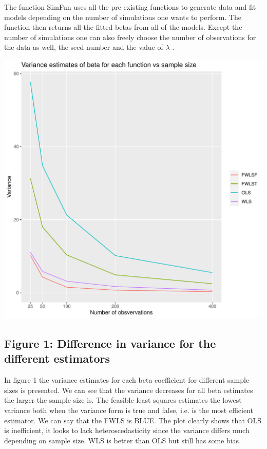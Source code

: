 \documentclass{article}\usepackage[]{graphicx}\usepackage[]{color}
\makeatletter
\def\maxwidth{ %
  \ifdim\Gin@nat@width>\linewidth
    \linewidth
  \else
    \Gin@nat@width
  \fi
}
\newenvironment{knitrout}{}{} %
\makeatother
\begin{document}
The function SimFun uses all the pre-existing functions to generate data and fit models depending on the number of simulations one wants to perform. The function then returns all the fitted betas from all of the models. Except the number of simulations one can also freely choose the number of observations for the data as well, the seed number and the value of $\lambda$ .

\begin{knitrout}
\color{fgcolor}
\includegraphics[width=\maxwidth]{figure/unnamed-chunk-6-1} 

\end{knitrout}

\subsection*{Figure 1: Difference in variance for the different estimators}

In figure 1 the variance estimates for each beta coefficient for different sample sizes is presented. We can see that the variance decreases for all beta estimates the larger the sample size is. The feasible least squares estimates the lowest variance both when the variance form is true and false, i.e. is the most efficient estimator. We can say that the FWLS is BLUE. The plot clearly shows that OLS is inefficient, it looks to lack heteroscedasticity since the variance differs much depending on sample size. WLS is better than OLS but still has some bias.
\end{document}
